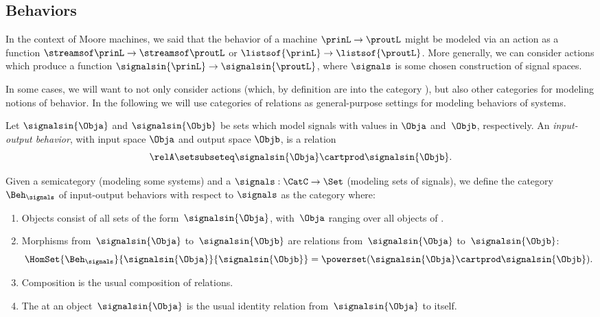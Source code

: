 \subsection{Behaviors}


In the context of Moore machines, we said that the behavior of a machine $\prinL \to \proutL$ might be modeled via an action as a function $\streamsof\prinL  \to \streamsof\proutL$ or $\listsof{\prinL} \to \listsof{\proutL}$.
More generally, we can consider actions which produce a function $\signalsin{\prinL} \to \signalsin{\proutL}$, where $\signals$ is some chosen construction of signal spaces.

In some cases, we will want to not only consider actions (which, by definition are  into the category \Set), but also other categories for modeling notions of behavior.
In the following we will use categories of relations as general-purpose settings for modeling behaviors of systems.

\begin{definition}\label{def:input-output-beh}
    Let $\signalsin{\Obja}$ and $\signalsin{\Objb}$ be sets which model signals with values in $\Obja$ and~$\Objb$, respectively.
    An \emph{input-output behavior}, with input space $\Obja$ and output space $\Objb$, is a relation
    \begin{equation}
        \relA \setsubseteq \signalsin{\Obja} \cartprod \signalsin{\Objb}.
    \end{equation}
\end{definition}

\begin{definition}
    \label{def:Beh}
    Given a semicategory \CatC (modeling some systems) and a  $\signals: \CatC \to \Set$ (modeling sets of signals), we define the category~$\Beh_\signals$ of input-output behaviors with respect to $\signals$ as the category where:
    \begin{enumerate}
        \item Objects consist of all sets of the form~$\signalsin{\Obja}$, with~$\Obja$ ranging over all objects of \CatC.
        \item Morphisms from~$\signalsin{\Obja}$ to~$\signalsin{\Objb}$ are relations from~$\signalsin{\Obja}$ to~$\signalsin{\Objb}$:
              \begin{equation}
                  \HomSet{\Beh_\signals}{\signalsin{\Obja}}{\signalsin{\Objb}} = \powerset (\signalsin{\Obja} \cartprod \signalsin{\Objb}).
              \end{equation}
        \item Composition is the usual composition of relations.
        \item The  at an object~$\signalsin{\Obja}$ is the usual identity relation from~$\signalsin{\Obja}$ to itself.
    \end{enumerate}
\end{definition}

